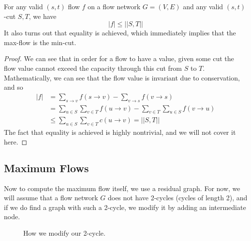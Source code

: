 \documentclass{article}
\begin{document}
    \begin{theorem}
      For any valid $(s, t)$ flow $f$ on a flow network $G = (V, E)$ and any valid $(s, t)$-cut $S, T$, we have 
      \begin{equation}
        |f| \leq ||S, T||
      \end{equation} 
      It also turns out that equality is achieved, which immediately implies that the max-flow is the min-cut. 
    \end{theorem}
    \begin{proof}
      We can see that in order for a flow to have a value, given some cut the flow value cannot exceed the capacity through this cut from $S$ to $T$. Mathematically, we can see that the flow value is invariant due to conservation, and so  
      \begin{align}
        |f| & = \sum_{s \rightarrow v} f(s \rightarrow v) - \sum_{v \rightarrow s} f(v \rightarrow s) \\ 
            & = \sum_{u \in S} \sum_{v \in T} f(u \rightarrow v) - \sum_{v \in T} \sum_{u \in S} f(v \rightarrow u) \\ 
            & \leq \sum_{u \in S} \sum_{v \in T} c(u \rightarrow v) = ||S, T||
      \end{align}
      The fact that equality is achieved is highly nontrivial, and we will not cover it here. 
    \end{proof} 

  \subsection{Maximum Flows}  

    Now to compute the maximum flow itself, we use a residual graph. For now, we will assume that a flow network $G$ does not have 2-cycles (cycles of length 2), and if we do find a graph with such a 2-cycle, we modify it by adding an intermediate node. 

    \begin{figure}[H]
      \centering 
      \caption{How we modify our 2-cycle.} 
      \label{fig:cycle_mod}
    \end{figure}
\end{document}
